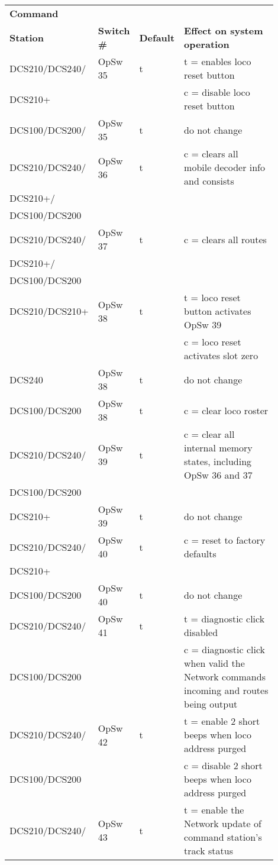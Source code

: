 \begin{tabular}{|p{0.2\linewidth}|p{0.125\linewidth}|p{0.1\linewidth}|p{0.475\linewidth}|} 
\hline
\textbf{Command} &&&\\
\textbf{Station} & \textbf{Switch \#} & \textbf{Default} & \textbf{Effect on system operation}\\
\hline
DCS210/DCS240/ & OpSw 35 & t & t = enables loco reset button\\
DCS210+&&& c = disable loco reset button\\
\hline
DCS100/DCS200/ & OpSw 35 & t & do not change\\
\hline
DCS210/DCS240/ & OpSw 36 & t & c = clears all mobile decoder info and consists\\
DCS210+/ &&&\\
DCS100/DCS200 &&&\\
\hline
DCS210/DCS240/ & OpSw 37 & t & c = clears all routes\\
DCS210+/ &&&\\
DCS100/DCS200 &&&\\
\hline
DCS210/DCS210+ & OpSw 38 & t & t = loco reset button activates OpSw 39\\
&&& c = loco reset activates slot zero\\ 
\hline
DCS240 & OpSw 38 & t & do not change\\ 
\hline
DCS100/DCS200 & OpSw 38 & t & c = clear loco roster\\ 
\hline
DCS210/DCS240/ & OpSw 39 & t & c = clear all internal memory states, including OpSw 36 and 37\\
DCS100/DCS200 &&&\\
\hline
DCS210+ & OpSw 39 & t & do not change\\ 
\hline
DCS210/DCS240/ & OpSw 40 & t & c = reset to factory defaults\\
DCS210+ &&&\\
\hline
DCS100/DCS200 & OpSw 40 & t & do not change\\ 
\hline
DCS210/DCS240/ & OpSw 41 & t & t = diagnostic click disabled\\
DCS100/DCS200&&& c = diagnostic click when valid the Network commands incoming and routes being output\\
\hline
DCS210/DCS240/ & OpSw 42 & t & t = enable 2 short beeps when loco address purged\\
DCS100/DCS200&&& c = disable 2 short beeps when loco address purged\\
\hline
DCS210/DCS240/ & OpSw 43 & t & t = enable the Network update of command station's track status\\

\end{tabular}
